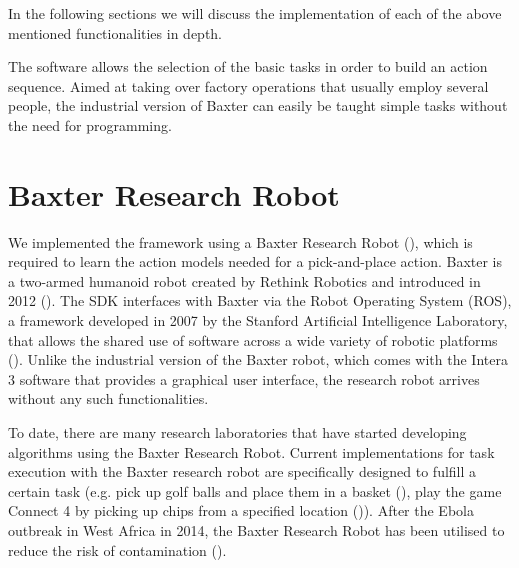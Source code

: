 In the following sections we will discuss the implementation of each of the above mentioned functionalities in depth.

The software allows the selection of the basic tasks in order to build an action sequence.
Aimed at taking over factory operations that usually employ several people, the industrial version of Baxter can easily be taught simple tasks without the need for programming.


\section{Baxter Research Robot}
We implemented the framework using a Baxter Research Robot (\cite{robotics2013baxter}), which is required to learn the action models needed for a pick-and-place action.
Baxter is a two-armed humanoid robot created by Rethink Robotics and introduced in 2012 (\cite{robotics2013baxter}).
The SDK interfaces with Baxter via the Robot Operating System (ROS), a framework developed in 2007 by the Stanford Artificial Intelligence Laboratory, that allows the shared use of software across a wide variety of robotic platforms (\cite{fernandez2015learning}).
Unlike the industrial version of the Baxter robot, which comes with the Intera 3 software that provides a graphical user interface, the research robot arrives without any such functionalities.

To date, there are many research laboratories that have started developing algorithms using the Baxter Research Robot.
Current implementations for task execution with the Baxter research robot are specifically designed to fulfill a certain task (e.g.
pick up golf balls and place them in a basket (\cite{BaxterGolf}), play the game Connect 4 by picking up chips from a specified location (\cite{Connect4})).
After the Ebola outbreak in West Africa in 2014, the Baxter Research Robot has been utilised to reduce the risk of contamination (\cite{Ebola}).


